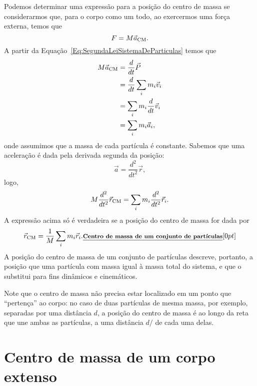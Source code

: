 Podemos determinar uma expressão para a posição do centro de massa se considerarmos que, para o corpo como um todo, ao exercermos uma força externa, temos que
\begin{equation}
    F = M \vec{a}_{\rm{CM}}.
\end{equation}
%
A partir da Equação~\ref{Eq:SegundaLeiSistemaDeParticulas} temos que
\begin{align}
    M \vec{a}_{\rm{CM}} &= \frac{d}{dt}\vec{P} \\
    &= \frac{d}{dt} \sum_{i} m_i \vec{v}_i \\
    &= \sum_{i} m_i \frac{d}{dt} \vec{v}_i \\
    &= \sum_{i} m_i \vec{a}_i,
\end{align}
%
onde assumimos que a massa de cada partícula é constante. Sabemos que uma aceleração é dada pela derivada segunda da posição:
\begin{equation}
    \vec{a} = \frac{d^2}{dt^2} \vec{r},
\end{equation}
%
logo,
\begin{equation}
    M \frac{d^2}{dt^2} \vec{r}_{\rm{CM}} =  \sum_{i} m_i \frac{d^2}{dt^2} \vec{r}_i.
\end{equation}
%
A expressão acima só é verdadeira se a posição do centro de massa for dada por
\begin{equation}\label{Eq:CMConjuntoDeParticulas}
    \vec{r}_{\rm{CM}} = \frac{1}{M} \sum_{i} m_i \vec{r}_i. \relax{\footnotesize\emph{\textbf{Centro de massa de um conjunto de partículas}}}[0pt]
\end{equation}
%
A posição do centro de massa de um conjunto de partículas descreve, portanto, a posição que uma partícula com massa igual à massa total do sistema, e que o substitui para fins dinâmicos e cinemáticos.

Note que o centro de massa não precisa estar localizado em um ponto que ``pertença'' ao corpo: no caso de duas partículas de mesma massa, por exemplo, separadas por uma distância $d$, a posição do centro de massa é ao longo da reta que une ambas as partículas, a uma distância $d/$ de cada uma delas.



\section{Centro de massa de um corpo extenso}


